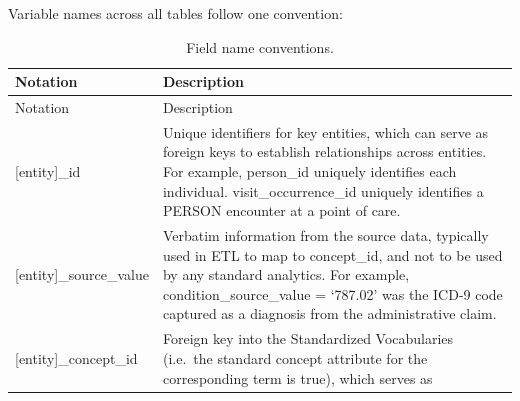 \documentclass[11pt]{book}
\begin{document}
Variable names across all tables follow one convention:

\begin{longtable}[]{@{}ll@{}}
\caption{\label{tab:fieldConventions} Field name
conventions.}\tabularnewline
\toprule
\begin{minipage}[b]{0.34\columnwidth}\raggedright\strut
Notation\strut
\end{minipage} & \begin{minipage}[b]{0.61\columnwidth}\raggedright\strut
Description\strut
\end{minipage}\tabularnewline
\midrule
\endfirsthead
\toprule
\begin{minipage}[b]{0.34\columnwidth}\raggedright\strut
Notation\strut
\end{minipage} & \begin{minipage}[b]{0.61\columnwidth}\raggedright\strut
Description\strut
\end{minipage}\tabularnewline
\midrule
\endhead
\begin{minipage}[t]{0.34\columnwidth}\raggedright\strut
{[}entity{]}\_id\strut
\end{minipage} & \begin{minipage}[t]{0.61\columnwidth}\raggedright\strut
Unique identifiers for key entities, which can serve as foreign keys to
establish relationships across entities. For example, person\_id
uniquely identifies each individual. visit\_occurrence\_id uniquely
identifies a PERSON encounter at a point of care.\strut
\end{minipage}\tabularnewline
\begin{minipage}[t]{0.34\columnwidth}\raggedright\strut
{[}entity{]}\_source\_value\strut
\end{minipage} & \begin{minipage}[t]{0.61\columnwidth}\raggedright\strut
Verbatim information from the source data, typically used in ETL to map
to concept\_id, and not to be used by any standard analytics. For
example, condition\_source\_value = `787.02' was the ICD-9 code captured
as a diagnosis from the administrative claim.\strut
\end{minipage}\tabularnewline
\begin{minipage}[t]{0.34\columnwidth}\raggedright\strut
{[}entity{]}\_concept\_id\strut
\end{minipage} & \begin{minipage}[t]{0.61\columnwidth}\raggedright\strut
Foreign key into the Standardized Vocabularies (i.e.~the standard
concept attribute for the corresponding term is true), which serves as

\end{minipage}
\end{longtable}
\end{document}
